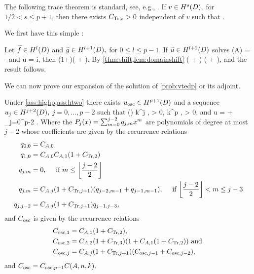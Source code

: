 The following trace theorem is standard, see, e.g., \cite[Theorem 3.37]{Mc:00}.
\label{thm:trace}
If $v \in \HsD,$ for $1/2 < s \leq p+1$, then there exists $C_{\mathrm{Tr},s} > 0$ independent of $v$ such that
\beqs
{} \leq \CTrs {}.
\eeqs
\enth

We first have this simple :

\ble\label{lem:domainshift}
Let $\ftilde \in \HlD$ and $\gtilde \in \HlpoD,$ for $0 \leq l \leq p-1$. If $\utilde \in \HlptD$ solves
\beqs
\grad \cdot \mleft(A\grad \utilde\mright) = -\ftilde
\eeqs
and
\beqs
\dn u = i\gtilde,
\eeqs
then
\beqs
\NHlptD{\utilde} \leq \CAl\mleft(1+\CTrlpo\mright)\mleft(\NHlD{\ftilde} + \NHlpoD{\gtilde}\mright).
\eeqs
\ele
{}
By \cref{thm:shift,lem:domainshift}
\beqs
\NHlptD{\utilde} \leq \CAl \mleft(\NHlD{\ftilde} + \NHlphGI{\gtilde}\mright) \leq \CAl \mleft(\NHlD{\ftilde} + \CTrs\NHlpoD{\gtilde}\mright),
\eeqs
and the result follows.
\epf

We can now prove our expansion of the solution of \cref{prob:vtedp} or its adjoint.

\label{thm:expansion}
Under \cref{ass:highp,ass:htwo} there exists $\uosc \in \HppoD$ and a sequence $\usj \in \HjptD,$ $j = 0,\ldots,p-2$ such that
\beq\label{eq:expansionuj}
\NHjptD{\usj} \leq \Pj() k^j , \Cj > 0,
\eeq
\beq\label{eq:expansionuosc}
\NHppoD{\uosc} \leq \Cosc k^p ,  \Cosc > 0,
\eeq
and
\beq\label{eq:expansionid}
u = \uosc + \sum_{j=0}^{p-2} \usj.
\eeq
Where the $P_{j}(x) = \sum_{m=0}^{j-2}q_{j,m}x^m $ are polynomials of degree at most $j-2$ whose coefficients are given by the recurrence relations
\begin{align*}
\pfn{0,0}&= \CAz\\
\pfn{1,0}&  = \CAz\CAo\mleft(1+\CTrt\mright)\\
\pfn{j,m}& = 0, \quad\tif m \leq \floor{\frac{j-2}2}\\
\pfn{j,m}& = \CAj\mleft(1+\CTrjpo\mright) \mleft(\pfn{j-2,m-1} + \pfn{j-1,m-1}\mright),\quad\tif \floor{\frac{j-2}2} < m \leq j-3\\
\pfn{j,j-2}& = \CAj\mleft(1+\CTrjpo\mright) \pfn{j-1,j-3},
\end{align*}
and $C_{\mathrm{osc}}$ is given by the recurrence relations
\begin{align*}
\Coscfn{1} &= \CAo\mleft(1+\CTrt\mright),\\
\Coscfn{2} &= \CAt\mleft(1+\CTrth\mright)\mleft(1 + \CAo\mleft(1+\CTrt\mright)\mright)\tand\\
\Coscfn{j} &= \CAfn{j}\mleft(1+\CTrfn{j+1}\mright)\mleft(\Coscfn{j-1} + \Coscfn{j-2}\mright),
\end{align*}
and $\Cosc = \Coscfn{p-1}\CAnk.$


